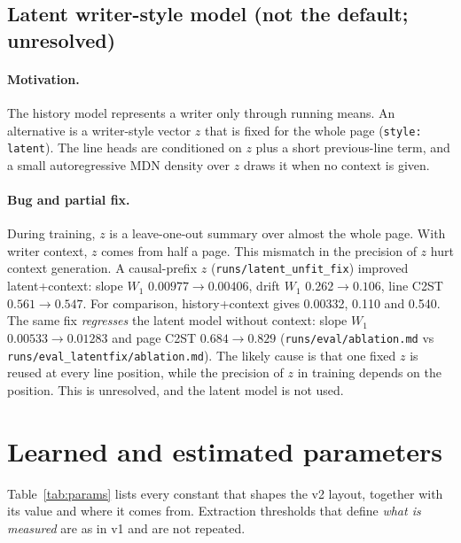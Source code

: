 \documentclass[11pt,a4paper]{article}
\newcommand{\src}[1]{{\footnotesize\texttt{#1}}}
\begin{document}
\subsection{Latent writer-style model (not the default; unresolved)}
\label{sec:latent}
\paragraph{Motivation.} The history model represents a writer only through
running means. An alternative is a writer-style vector $z$ that is fixed for the
whole page (\texttt{style: latent}). The line heads are conditioned on $z$ plus
a short previous-line term, and a small autoregressive MDN density over $z$ draws
it when no context is given.

\paragraph{Bug and partial fix.} During training, $z$ is a leave-one-out
summary over almost the whole page. With writer context, $z$ comes from half a
page. This mismatch in the precision of $z$ hurt context generation. A
causal-prefix $z$ (\texttt{runs/latent\_unfit\_fix}) improved latent+context:
slope $W_1$ $0.00977\to0.00406$, drift $W_1$ $0.262\to0.106$, line C2ST
$0.561\to0.547$. For comparison, history+context gives 0.00332, 0.110 and
0.540. The same fix \emph{regresses} the latent model without context:
slope $W_1$ $0.00533\to0.01283$ and page C2ST $0.684\to0.829$
(\src{runs/eval/ablation.md} vs \src{runs/eval\_latentfix/ablation.md}). The
likely cause is that one fixed $z$ is reused at every line position, while the
precision of $z$ in training depends on the position. This is unresolved, and
the latent model is not used.

\section{Learned and estimated parameters}
\label{sec:params}
Table~\ref{tab:params} lists every constant that shapes the v2 layout,
together with its value and where it comes from. Extraction thresholds that
define \emph{what is measured} are as in v1 and are not repeated.
\end{document}
